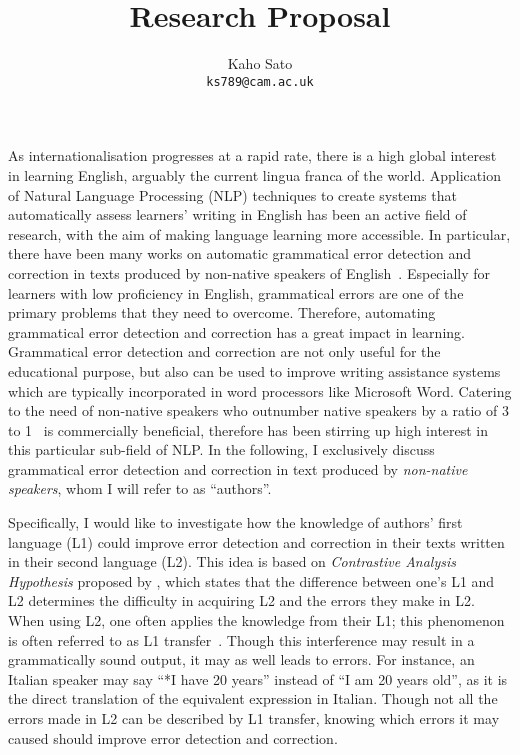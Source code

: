 \documentclass[11pt]{article}
\title{Research Proposal}
\author{
 Kaho Sato\\
  \texttt{ks789@cam.ac.uk}
}
\begin{document}
\maketitle
As internationalisation progresses at a rapid rate, there is a high global interest in learning English, arguably the current lingua franca of the world. Application of Natural Language Processing (NLP) techniques to create systems that automatically assess learners' writing in English has been an active field of research, with the aim of making language learning more accessible. In particular, there have been many works on automatic grammatical error detection and correction in texts produced by non-native speakers of English~\citep{izumi2003automatic, eeg2003automatic, han2006detecting, tetreault2008ups, de2008classifier, gamon2008using, gamon2010using, ng2014conll}. Especially for learners with low proficiency in English, grammatical errors are one of the primary problems that they need to overcome. Therefore, automating grammatical error detection and correction has a great impact in learning. Grammatical error detection and correction are not only useful for the educational purpose, but also can be used to improve writing assistance systems which are typically incorporated in word processors like Microsoft Word. Catering to the need of non-native speakers who outnumber native speakers by a ratio of 3 to 1~\citep{sussex1999david} is commercially beneficial, therefore has been stirring up high interest in this particular sub-field of NLP. In the following, I exclusively discuss grammatical error detection and correction in text produced by \emph{non-native speakers}, whom I will refer to as ``authors''.

Specifically, I would like to investigate how the knowledge of authors' first language (L1) could improve error detection and correction in their texts written in their second language (L2). This idea is based on \emph{Contrastive Analysis Hypothesis} proposed by \cite{lado1957linguistics}, which states that the difference between one's L1 and L2 determines the difficulty in acquiring L2 and the errors they make in L2. 
When using L2, one often applies the knowledge from their L1; this phenomenon is often referred to as L1 transfer~\citep{wanner1982language, frenck1997syntactic, dussias2003syntactic, nitschke2010first}. Though this interference may result in a grammatically sound output, it may as well leads to errors. For instance, an Italian speaker may say ``*I have 20 years'' instead of ``I am 20 years old'', as it is the direct translation of the equivalent expression in Italian. Though not all the errors made in L2 can be described by L1 transfer, knowing which errors it may caused should improve error detection and correction.
\end{document}
